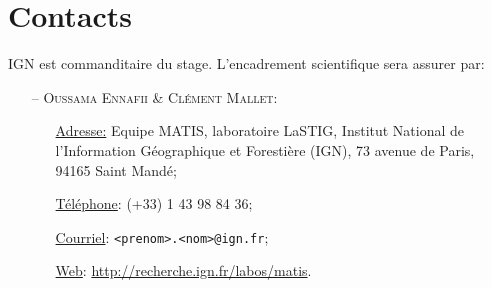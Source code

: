 \documentclass[a4paper,11pt]{article}
\begin{document}
    \section*{Contacts}
    IGN est commanditaire du stage. L'encadrement scientifique sera assurer par:
    \begin{itemize}
        \item[--] \textsc{Oussama Ennafii \& Clément Mallet:}
        \begin{itemize}
            \item[\underline{Adresse:}] Equipe MATIS, laboratoire LaSTIG, Institut National de l'Information Géographique et Forestière (IGN), 73 avenue de Paris, 94165 Saint Mandé;
            \item[\underline{Téléphone}:] (+33) 1 43 98 84 36;
            \item[\underline{Courriel}:] \texttt{<prenom>.<nom>@ign.fr};
            \item[\underline{Web}:] \url{http://recherche.ign.fr/labos/matis}.
        \end{itemize}
    \end{itemize}
\end{document}
